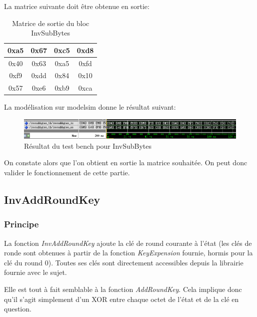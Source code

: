\documentclass[a4paper, 12pt]{article}
\begin{document}
		La matrice suivante doit être obtenue en sortie: \\
			\begin{table}[H]
				\begin{center}
				\begin{tabular}{|c|c|c|c|}
					\hline
					0xa5 & 0x67 & 0xc5 & 0xd8 \\
					\hline
					0x40 & 0x63 & 0xa5 & 0xfd \\
					\hline
					0xf9 & 0xdd & 0x84 & 0x10 \\
					\hline
					0x57 & 0xe6 & 0xb9 & 0xca \\
					\hline
				\end{tabular}
				\caption{Matrice de sortie du bloc InvSubBytes}
				\label{MatriceSortieInvSubBytes}
				\end{center}
			\end{table}
		La modélisation sur modelsim donne le résultat suivant:
		\begin{figure}[H]
			\begin{center}
			\includegraphics[scale=0.70]{Images/InvSubBytesTb.png}
			\end{center}
			\caption{Résultat du test bench pour InvSubBytes}
			\label{InvSubBytesTb}
		\end{figure}
	On constate alors que l'on obtient en sortie la matrice souhaitée. On peut donc valider le fonctionnement de cette partie.

	\subsection{InvAddRoundKey}
		\subsubsection{Principe}
	La fonction \emph{InvAddRoundKey} ajoute la clé de round courante à l'état (les clés de ronde sont obtenues à partir de la fonction \emph{KeyExpension} fournie, hormis pour la clé du round 0). Toutes ses clés sont directement accessibles depuis la librairie fournie avec le sujet. 
\par Elle est tout à fait semblable à la fonction \emph{AddRoundKey}. Cela implique donc qu'il s'agit simplement d'un XOR entre chaque octet de l'état et de la clé en question.
\end{document}
